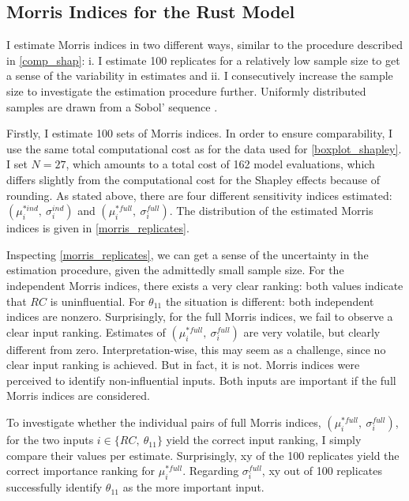 \subsection{Morris Indices for the Rust Model} \label{morris_rust_model}

I estimate Morris indices in two different ways, similar to the procedure described in \cref{comp_shap}: i. I estimate 100 replicates for a relatively low sample size to get a sense of the variability in estimates and ii. I consecutively increase the sample size to investigate
the estimation procedure further. Uniformly distributed samples are drawn from a Sobol'
sequence \citep{S76}.

Firstly, I estimate 100 sets of Morris indices. In order to ensure comparability, I use the same total computational cost as for the data used for \cref{boxplot_shapley}. I set $N = 27$, which amounts
to a total cost of 162 model evaluations, which differs slightly from the computational
cost for the Shapley effects because of rounding. As stated above, there are four different
sensitivity indices estimated: $(\mu^{\ast ind}_i,\ \sigma_i^{ind})$ and $(\mu^{\ast full}_i,\ \sigma_i^{full})$. The distribution of the
estimated Morris indices is given in \cref{morris_replicates}.

Inspecting \cref{morris_replicates}, we can get a sense of the uncertainty in the estimation procedure,
given the admittedly small sample size. For the independent Morris indices, there exists a
very clear ranking: both values indicate that $RC$ is uninfluential. For $\theta_{11}$ the situation is
different: both independent indices are nonzero. Surprisingly, for the full Morris indices,
we fail to observe a clear input ranking. Estimates of $(\mu^{\ast full}_i,\ \sigma_i^{full})$ are very volatile, but
clearly different from zero. Interpretation-wise, this may seem as a challenge, since no
clear input ranking is achieved. But in fact, it is not. Morris indices were perceived to
identify non-influential inputs. Both inputs are important if the full Morris indices are
considered.

To investigate whether the individual pairs of full Morris indices, $(\mu^{\ast full}_i,\ \sigma_i^{full})$, for the
two inputs $i \in \{RC,\ \theta_{11}\}$ yield the correct input ranking, I simply compare their values
per estimate. Surprisingly, xy of the 100 replicates yield the correct importance ranking
for $\mu^{\ast full}_i$. Regarding $\sigma_i^{full}$, xy out of 100 replicates successfully identify $\theta_{11}$ as the more
important input.

